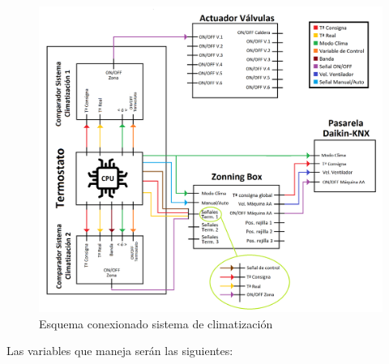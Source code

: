  \begin{center}
\begin{figure}[H]
\includegraphics[width=1.15\textwidth]{figures/prog_termost.png}   
\caption{Esquema conexionado sistema de climatización}
\label{fig:prog_termost}
\end{figure}
\end{center}
Las variables que maneja serán las siguientes: 
